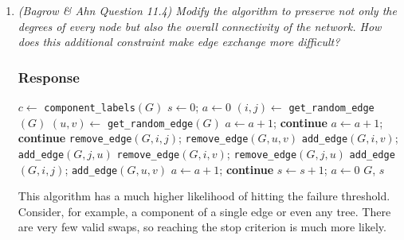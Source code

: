 \documentclass{article}
\newcommand{\response}{\subsubsection*{Response}}
\begin{document}
\begin{enumerate}[label=(\alph*)]
    \item \textit{(Bagrow \& Ahn Question 11.4) Modify the algorithm to preserve not only the degrees of every node but also the overall connectivity of the network. How does this additional constraint make edge exchange more difficult?}
    \response
\begin{algorithmic}[1]
    \State $c \gets$ \texttt{component\_labels}$(G)$ 
    \State $s \gets 0$; \quad $a \gets 0$
        \State $(i, j) \gets$ \texttt{get\_random\_edge}$(G)$
        \State $(u, v) \gets$ \texttt{get\_random\_edge}$(G)$
            \State $a \gets a + 1$; \textbf{continue}
        \EndIf
            \State $a \gets a + 1$; \textbf{continue}
        \EndIf
        \State \texttt{remove\_edge}$(G, i, j)$; \texttt{remove\_edge}$(G, u, v)$
        \State \texttt{add\_edge}$(G, i, v)$; \texttt{add\_edge}$(G, j, u)$
            \State \texttt{remove\_edge}$(G, i, v)$; \texttt{remove\_edge}$(G, j, u)$ 
            \State \texttt{add\_edge}$(G, i, j)$; \texttt{add\_edge}$(G, u, v)$
            \State $a \gets a + 1$; \textbf{continue}
        \EndIf
        \State $s \gets s + 1$; \quad $a \gets 0$
    \EndWhile
    \State \Return $G$, $s$
\EndProcedure
\end{algorithmic}

This algorithm has a much higher likelihood of hitting the failure threshold. Consider, for example, a component of a single edge or even any tree. There are very few valid swaps, so reaching the stop criterion is much more likely.


\end{enumerate}
\end{document}
